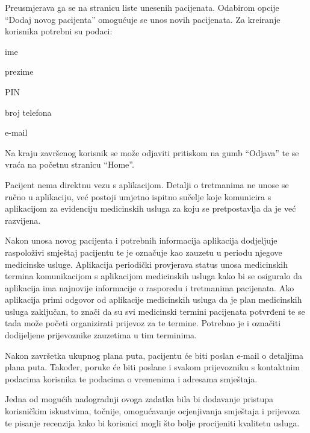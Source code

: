 		\noindent Preusmjerava ga se na stranicu liste unesenih pacijenata. Odabirom opcije “Dodaj novog pacijenta” omogućuje se unos novih pacijenata. Za kreiranje korisnika potrebni su podaci:

		\begin{packed_item}
			\item ime
			\item prezime
			\item PIN
			\item broj telefona
			\item e-mail
		\end{packed_item}
		
		\noindent Na kraju završenog korisnik se može odjaviti pritiskom na gumb “Odjava” te se vraća na početnu stranicu “Home”. 
		
		Pacijent nema direktnu vezu s aplikacijom. Detalji o tretmanima ne unose se ručno u aplikaciju, već postoji umjetno ispitno sučelje koje komunicira s aplikacijom za evidenciju medicinskih usluga za koju se pretpostavlja da je već razvijena.  
		
		Nakon unosa novog pacijenta i potrebnih informacija aplikacija dodjeljuje raspoloživi smještaj pacijentu te je označuje kao zauzetu u periodu njegove medicinske usluge. Aplikacija periodički provjerava status unosa medicinskih termina komunikacijom s aplikacijom medicinskih usluga kako bi se osiguralo da aplikacija ima najnovije informacije o rasporedu i tretmanima pacijenata. Ako aplikacija primi odgovor od aplikacije medicinskih usluga da je plan medicinskih usluga zaključan, to znači da su svi medicinski termini pacijenata potvrđeni te se tada može početi organizirati prijevoz za te termine. Potrebno je i označiti dodijeljene prijevoznike zauzetima u tim terminima. 
		
		Nakon završetka ukupnog plana puta, pacijentu će biti poslan e-mail o detaljima plana puta. Također, poruke će biti poslane i svakom prijevozniku s kontaktnim podacima korisnika te podacima o vremenima i adresama smještaja. 
		
		Jedna od mogućih nadogradnji ovoga zadatka bila bi dodavanje pristupa korisničkim iskustvima, točnije, omogućavanje ocjenjivanja smještaja i prijevoza te pisanje recenzija kako bi korisnici mogli što bolje procijeniti kvalitetu usluga.  
		
		\eject
		
	
		
	